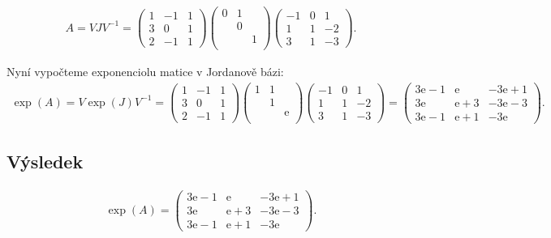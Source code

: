 \documentclass[]{article}
\newcommand{\e}{\mathrm{e}}
\begin{document}
\begin{align*}
    A = V J V^{-1} =
    \begin{pmatrix}
        1 & -1 & 1 \\
        3 &  0 & 1 \\
        2 & -1 & 1
    \end{pmatrix}
    \begin{pmatrix}
        0 & 1 \\
          & 0 \\
          &   & 1 \\
    \end{pmatrix}
    \begin{pmatrix}
        -1 & 0 & 1 \\
         1 & 1 & -2 \\
         3 & 1 & -3
    \end{pmatrix}.
\end{align*}

\medskip
\medskip

Nyní vypočteme exponenciolu matice v Jordanově bázi:
\begin{align*}
    \exp(A) = V \exp(J) V^{-1} = 
    \begin{pmatrix}
        1 & -1 & 1 \\
        3 &  0 & 1 \\
        2 & -1 & 1
    \end{pmatrix}
    \begin{pmatrix}
        1 & 1 \\
          & 1 \\
          &   & \e \\
    \end{pmatrix}
    \begin{pmatrix}
        -1 & 0 & 1 \\
         1 & 1 & -2 \\
         3 & 1 & -3
    \end{pmatrix}
    =
    \begin{pmatrix}
        3\e - 1 & \e & -3\e + 1 \\
        3\e & \e + 3 & -3\e - 3 \\
        3\e - 1 & \e + 1  & -3\e
    \end{pmatrix}.
\end{align*}

\subsection{Výsledek}
\begin{align*}
    \exp(A) =
    \begin{pmatrix}
        3\e - 1 & \e & -3\e + 1 \\
        3\e & \e + 3 & -3\e - 3 \\
        3\e - 1 & \e + 1  & -3\e
    \end{pmatrix}.
\end{align*}
\end{document}
